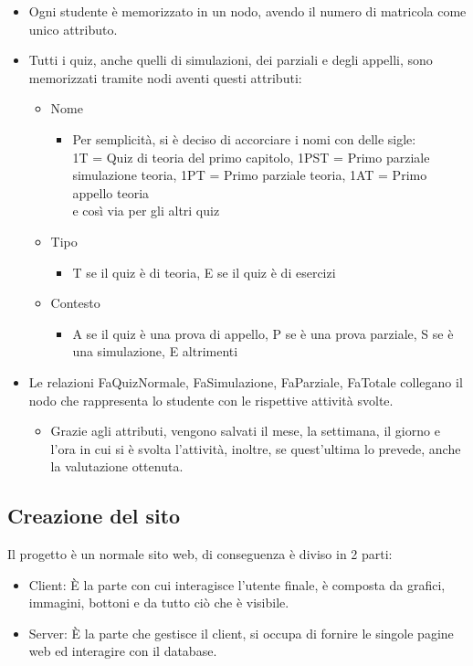 \begin{itemize}
\item Ogni studente è memorizzato in un nodo, avendo il numero di matricola come unico attributo.
\item Tutti i quiz, anche quelli di simulazioni, dei parziali e degli appelli, sono memorizzati tramite nodi aventi questi attributi:
\begin{itemize}
\item Nome
\begin{itemize}
\item Per semplicità, si è deciso di accorciare i nomi con delle sigle: \\
1T = Quiz di teoria del primo capitolo, 1PST = Primo parziale simulazione teoria, 1PT = Primo parziale teoria, 1AT = Primo appello teoria \\
e così via per gli altri quiz 
\end{itemize}
\item Tipo
\begin{itemize}
\item T se il quiz è di teoria, E se il quiz è di esercizi
\end{itemize}
\item Contesto
\begin{itemize}
\item A se il quiz è una prova di appello, P se è una prova parziale, S se è una simulazione, E altrimenti 
\end{itemize}
\end{itemize}
\item Le relazioni FaQuizNormale, FaSimulazione, FaParziale, FaTotale collegano il nodo che rappresenta lo studente con le rispettive attività svolte.
\begin{itemize}
\item Grazie agli attributi, vengono salvati il mese, la settimana, il giorno e l'ora in cui si è svolta l'attività, inoltre, se quest'ultima lo prevede, anche la valutazione ottenuta.
\end{itemize} 
\end{itemize}

\subsection{Creazione del sito}

Il progetto è un normale sito web, di conseguenza è diviso in 2 parti:
\begin{itemize}
\item Client: È la parte con cui interagisce l'utente finale, è composta da grafici, immagini, bottoni e da tutto ciò che è visibile.
\item Server: È la parte che gestisce il client, si occupa di fornire le singole pagine web ed interagire con il database. 
\end{itemize}
